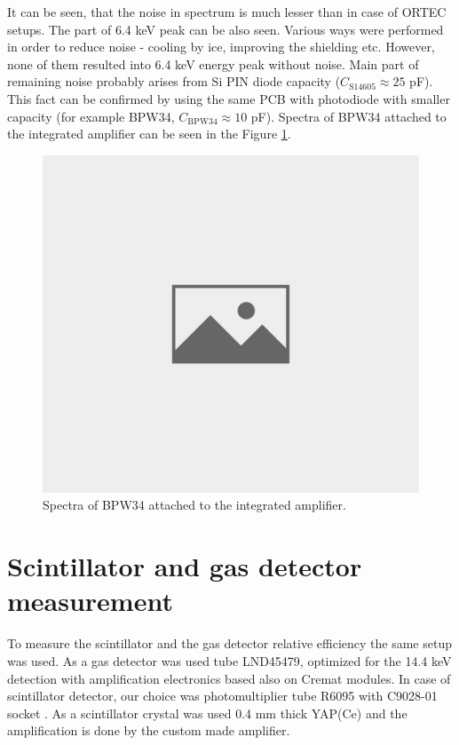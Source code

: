 It can be seen, that the noise in spectrum is much lesser than in case of ORTEC setups. The part of 6.4 keV peak can be also seen. Various ways were performed in order to reduce noise - cooling by ice, improving the shielding etc. However, none of them resulted into 6.4 keV energy peak without noise. Main part of remaining noise probably arises from Si PIN diode capacity ($C_{\textrm{S14605}} \approx 25$ pF). This fact can be confirmed by using the same PCB with photodiode with smaller capacity (for example BPW34, $C_{\textrm{BPW34}} \approx 10$ pF). Spectra of BPW34 attached to the integrated amplifier can be seen in the Figure \ref{BPW34 integrated amplifier spectra.}.


\begin{figure}[H]
\centering
\includegraphics[scale=0.125, angle = 0]{./pictures/NoPicture.jpg}
\caption{Spectra of BPW34 attached to the integrated amplifier.}
\label{BPW34 integrated amplifier spectra.}

\end{figure}


\section{Scintillator and gas detector measurement}
To measure the scintillator and the gas detector relative efficiency the same setup was used. As a gas detector was used tube LND45479, optimized for the 14.4 keV detection with amplification electronics based also on Cremat modules. In case of scintillator detector, our choice was photomultiplier tube R6095 \cite{R6095} with C9028-01 socket \cite{C9028}. As a scintillator crystal was used 0.4 mm thick YAP(Ce) and the amplification is done by the custom made amplifier\cite{STEJSKAL2019thesis}.


